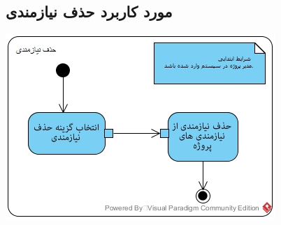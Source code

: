 \subsection*{مورد کاربرد حذف نیازمندی}
\vspace{2cm}
\begin{center}
\includegraphics[width=\textwidth]{ActivityDiagrams/25.jpg}
\end{center}

\newpage
\vspace{2cm}
